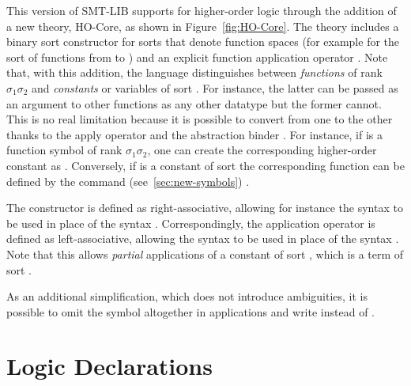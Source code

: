 \begin{newver}
This version of SMT-LIB supports for higher-order logic through the addition
of a new theory, HO-Core, as shown in Figure~\ref{fig:HO-Core}.
The theory includes a binary sort constructor \ter{->} for sorts 
that denote function spaces 
(for example  for the sort of functions from  to )
and an explicit function application operator \ter{\_}.
Note that, with this addition, the language distinguishes 
between \emph{functions} of rank $\sigma_1\sigma_2$
and \emph{constants} or variables of sort .
For instance, the latter can be passed as an argument to other functions 
as any other datatype but the former cannot.
This is no real limitation because it is possible to convert from one to the other
thanks to the apply operator \ter{\_} and the abstraction binder .
For instance, if  is a function symbol of rank $\sigma_1\sigma_2$,
one can create the corresponding higher-order constant as
.
Conversely, if  is a constant of sort 
the corresponding function can be defined by the command (see~\ref{sec:new-symbols})
.

The \ter{->} constructor is defined as right-associative, allowing for instance the syntax
 to be used in place of the syntax
.
Correspondingly, the application operator \ter{\_} is defined as left-associative, allowing the syntax
 to be used in place of the syntax
.
Note that this allows \emph{partial} applications  of a constant  
of sort ,
which is a term of sort .

As an additional simplification, which does not introduce ambiguities,  
it is possible to omit the \ter{\_} symbol altogether in applications and write
 instead of .
\end{newver} 


\section{Logic Declarations} \label{sec:logic-declarations}

